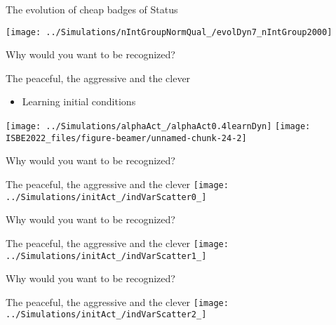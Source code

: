 \documentclass[
  ignorenonframetext,
  aspectratio=169]{beamer}
\providecommand{\tightlist}{%
  \setlength{\itemsep}{0pt}\setlength{\parskip}{0pt}}
\begin{document}
\begin{frame}{The evolution of cheap badges of Status}
\protect\hypertarget{the-evolution-of-cheap-badges-of-status}{}
\begin{center}\texttt{[image: ../Simulations/nIntGroupNormQual\_/evolDyn7\_nIntGroup2000]} \end{center}
\end{frame}

\begin{frame}{Why would you want to be recognized?}
\protect\hypertarget{why-would-you-want-to-be-recognized}{}
\vspace{-1cm}

\begin{block}{The peaceful, the aggressive and the clever}
\protect\hypertarget{the-peaceful-the-aggressive-and-the-clever}{}
\begin{itemize}
\tightlist
\item
  Learning initial conditions
\end{itemize}

\texttt{[image: ../Simulations/alphaAct\_/alphaAct0.4learnDyn]}
\texttt{[image: ISBE2022\_files/figure-beamer/unnamed-chunk-24-2]}
\end{block}
\end{frame}

\begin{frame}{Why would you want to be recognized?}
\protect\hypertarget{why-would-you-want-to-be-recognized-1}{}
\begin{block}{The peaceful, the aggressive and the clever}
\protect\hypertarget{the-peaceful-the-aggressive-and-the-clever-1}{}
\texttt{[image: ../Simulations/initAct\_/indVarScatter0\_]}
\end{block}
\end{frame}

\begin{frame}{Why would you want to be recognized?}
\protect\hypertarget{why-would-you-want-to-be-recognized-2}{}
\begin{block}{The peaceful, the aggressive and the clever}
\protect\hypertarget{the-peaceful-the-aggressive-and-the-clever-2}{}
\texttt{[image: ../Simulations/initAct\_/indVarScatter1\_]}
\end{block}
\end{frame}

\begin{frame}{Why would you want to be recognized?}
\protect\hypertarget{why-would-you-want-to-be-recognized-3}{}
\begin{block}{The peaceful, the aggressive and the clever}
\protect\hypertarget{the-peaceful-the-aggressive-and-the-clever-3}{}
\texttt{[image: ../Simulations/initAct\_/indVarScatter2\_]}
\end{block}
\end{frame}
\end{document}

